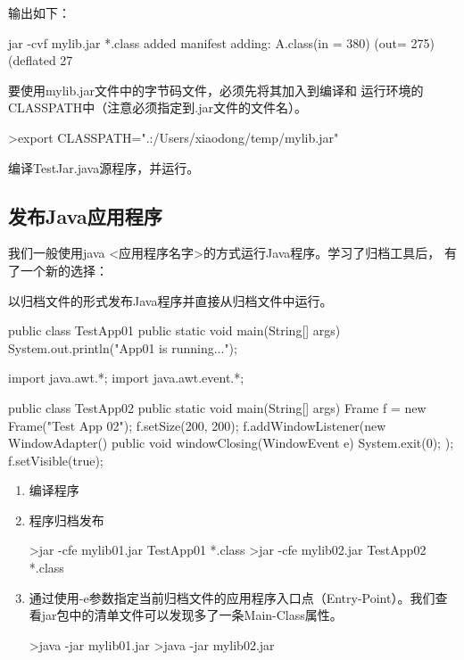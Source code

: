 输出如下：

\begin{stdoutCode}
  jar -cvf mylib.jar *.class
  added manifest
  adding: A.class(in = 380) (out= 275)(deflated 27%
\end{stdoutCode}

 要使用mylib.jar文件中的字节码文件，必须先将其加入到编译和
运行环境的CLASSPATH中（注意必须指定到.jar文件的文件名）。

\begin{shCode}
  >export CLASSPATH=".:/Users/xiaodong/temp/mylib.jar"
\end{shCode}

 编译TestJar.java源程序，并运行。

\subsection{发布Java应用程序}

我们一般使用java <应用程序名字>的方式运行Java程序。学习了归档工具后，
有了一个新的选择：

{\Blue\hei 以归档文件的形式发布Java程序并直接从归档文件中运行。}
  

\begin{javaCode}
  public class TestApp01 {
    public static void main(String[] args) {
      System.out.println("App01 is running...");
    }
  }  
\end{javaCode}


\begin{javaCode}
  import java.awt.*;
  import java.awt.event.*;

  public class TestApp02 {
    public static void main(String[] args) {
      Frame f = new Frame("Test App 02");
      f.setSize(200, 200);
      f.addWindowListener(new WindowAdapter() {
        public void windowClosing(WindowEvent e) {
          System.exit(0);
        }
      });
      f.setVisible(true);
    }
  }
\end{javaCode}

\begin{enumerate}
\item 编译程序
\item 程序归档发布
  \begin{shCode}
    >jar -cfe mylib01.jar TestApp01 *.class
    >jar -cfe mylib02.jar TestApp02 *.class
  \end{shCode}
\item 通过使用-e参数指定当前归档文件的应用程序入口点（Entry-Point）。我们查
  看jar包中的清单文件可以发现多了一条Main-Class属性。
  \begin{shCode}
    >java -jar mylib01.jar
    >java -jar mylib02.jar
  \end{shCode}
\end{enumerate}  


